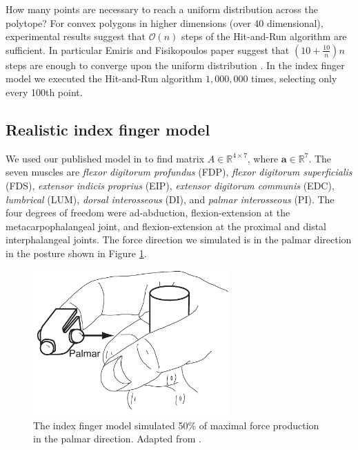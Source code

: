 How many points are necessary to reach a uniform distribution across the polytope?
For convex polygons in higher dimensions (over 40 dimensional), experimental results suggest that $\mathcal{O}(n)$ steps of the Hit-and-Run algorithm are sufficient. In particular Emiris and Fisikopoulos paper suggest that $(10 + \frac{10}{n})n$ steps are enough to converge upon the uniform distribution \cite{emiris2013efficient}.
In the index finger model we executed the Hit-and-Run algorithm $1,000,000$ times, selecting only every 100th point.

\subsection{Realistic index finger model}
\label{ss:finger}
We used our published model in \cite{Valero-Cuevas1998Large} to find matrix $A \in \mathbb{R}^{4 \times 7}$, where $\textbf{a} \in \mathbb{R}^7$. The seven muscles are \emph{flexor digitorum profundus} (FDP), \emph{flexor digitorum superficialis} (FDS), \emph{extensor indicis proprius} (EIP), \emph{extensor digitorum communis} (EDC), \emph{lumbrical} (LUM), \emph{dorsal interosseous} (DI), and \emph{palmar interosseous} (PI). The four degrees of freedom were ad-abduction, flexion-extension at the metacarpophalangeal joint, and flexion-extension at the proximal and distal interphalangeal joints. The force direction we simulated is in the palmar direction in the posture shown in Figure \ref{fig:finger}.
\begin{figure}[htbp]
\centering
\includegraphics[width=7.5cm]{sections/figs/finger.pdf}
\caption{The index finger model simulated 50\% of maximal force production in the palmar direction. Adapted from \cite{Valero-Cuevas1998Large}.}
\label{fig:finger}
\end{figure}


